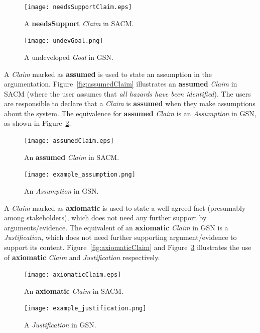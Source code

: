 \begin{figure}
	\centering
	\begin{minipage}[b]{0.7\textwidth}
		\texttt{[image: needsSupportClaim.eps]}
		\caption{A \textbf{needsSupport} \textit{Claim} in SACM.}
		\label{fig:needsSupportClaim}
	\end{minipage}
	\hfill
	\begin{minipage}[b]{0.28\textwidth}
		\texttt{[image: undevGoal.png]}
		\caption{A undeveloped \textit{Goal} in GSN.}
		\label{fig:undevGoal}
	\end{minipage}
\end{figure}



A \textit{Claim} marked as \textbf{assumed} is used to state an assumption in the argumentation. Figure~\ref{fig:assumedClaim} illustrates an \textbf{assumed} \textit{Claim} in SACM (where the user assumes that \textit{all hazards have been identified}). 
The users are responsible to declare that a \textit{Claim} is \textbf{assumed} when they make assumptions about the system. 
The equivalence for \textbf{assumed} \textit{Claim} is an \textit{Assumption} in GSN, as shown in Figure~\ref{fig:example_assumption}.

\begin{figure}
	\centering
	\begin{minipage}[b]{0.7\textwidth}
		\texttt{[image: assumedClaim.eps]}
		\caption{An \textbf{assumed} \textit{Claim} in SACM.}
		\label{fig:assumedClaim}
	\end{minipage}
	\hfill
	\begin{minipage}[b]{0.28\textwidth}
		\texttt{[image: example\_assumption.png]}
		\caption{An \textit{Assumption} in GSN.}
		\label{fig:example_assumption}
	\end{minipage}
\end{figure}



A \textit{Claim} marked as \textbf{axiomatic} is used to state a well agreed fact (presumably among stakeholders), which does not need any further support by arguments/evidence. 
The equivalent of an \textbf{axiomatic} \textit{Claim} in GSN is a \textit{Justification}, which does not need further supporting argument/evidence to support its content. 
Figure~\ref{fig:axiomaticClaim} and Figure~\ref{fig:example_justification} illustrates the use of \textbf{axiomatic} \textit{Claim} and \textit{Justification} respectively.

\begin{figure}
	\centering
	\begin{minipage}[b]{0.7\textwidth}
		\texttt{[image: axiomaticClaim.eps]}
		\caption{An \textbf{axiomatic} \textit{Claim} in SACM.}
		\label{fig:axiomaticClaim}
	\end{minipage}
	\hfill
	\begin{minipage}[b]{0.28\textwidth}
		\texttt{[image: example\_justification.png]}
		\caption{A \textit{Justification} in GSN.}
		\label{fig:example_justification}
	\end{minipage}
\end{figure}

